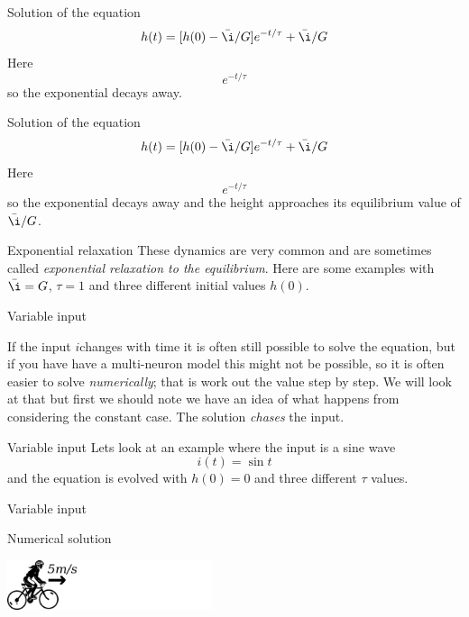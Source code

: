 \documentclass{beamer}
\newcommand{\crish}{\color{reddish}}
\newcommand{\cbla}{\color{black}}
\newcommand{\cblu}{\color{blue}}
\begin{document}
\begin{frame}{Solution of the equation}
  \crish{}
$$h(t)=[h(0)-\bar{\i}/G]\cblu{}e^{-t/\tau}\crish{}+\bar{\i}/G$$
\cbla{}Here\cblu
$$e^{-t/\tau}$$
\cbla{}so the exponential decays away.
\end{frame}


\begin{frame}{Solution of the equation}
  \crish{}
$$h(t)=[h(0)-\bar{\i}/G]e^{-t/\tau}+\cblu{}\bar{\i}/G\crish{}$$
\cbla{}Here\cblu
$$e^{-t/\tau}$$
\cbla{}so the exponential decays away and the height approaches its equilibrium value of \cblu$\bar{\i}/G$\crish.
\end{frame}

\begin{frame}{Exponential relaxation}
  These dynamics are very common and are sometimes called \textsl{exponential relaxation to the equilibrium}. Here are some examples with \crish$\bar{\i}=G$\cbla, \crish$\tau=1$\cbla{} and three different initial values \crish$h(0)$\cbla.
\begin{center}

\end{center}
\end{frame}


\begin{frame}{Variable input}

If the input \crish$i$\cbla changes with time it is often still
possible to solve the equation, but if you have have a multi-neuron
model this might not be possible, so it is often easier to solve
\textsl{numerically}; that is work out the value step by step. We will
look at that but first we should note we have an idea of what happens
from considering the constant case. The solution \textsl{chases} the
input.

\end{frame}
  
\begin{frame}{Variable input}
  Lets look at an example where the input is a sine wave\cblu
  $$i(t)=\sin{t}$$
  \cbla{}and the equation is evolved with \crish$h(0)=0$\cbla{} and three different \crish$\tau$\cbla{}  values.
\end{frame}
  
\begin{frame}{Variable input}
  \vskip -0.7cm
  
\end{frame}

\begin{frame}{Numerical solution}
  \begin{center}
    \includegraphics[width=6cm]{cyclist1.png}
  \end{center}
  \end{frame}
\end{document}
